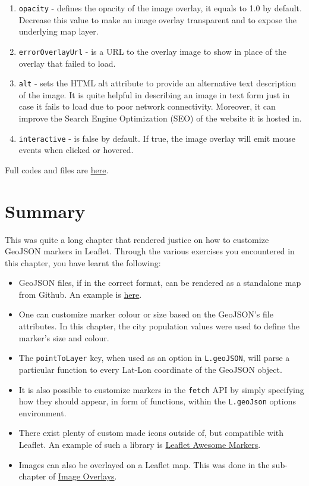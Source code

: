 \documentclass[
]{book}
\begin{document}
\begin{enumerate}
\def\labelenumi{\arabic{enumi}.}
\item
  \texttt{opacity} - defines the opacity of the image overlay, it equals to 1.0 by default. Decrease this value to make an image overlay transparent and to expose the underlying map layer.
\item
  \texttt{errorOverlayUrl} - is a URL to the overlay image to show in place of the overlay that failed to load.
\item
  \texttt{alt} - sets the HTML alt attribute to provide an alternative text description of the image. It is quite helpful in describing an image in text form just in case it fails to load due to poor network connectivity. Moreover, it can improve the Search Engine Optimization (SEO) of the website it is hosted in.
\item
  \texttt{interactive} - is false by default. If true, the image overlay will emit mouse events when clicked or hovered.
\end{enumerate}

Full codes and files are \href{https://github.com/sammigachuhi/my-leaflet-project/tree/main/my-leaflet-code/chapter-6-custom-markers}{here}.

\hypertarget{summary-5}{%
\section{Summary}\label{summary-5}}

This was quite a long chapter that rendered justice on how to customize GeoJSON markers in Leaflet. Through the various exercises you encountered in this chapter, you have learnt the following:

\begin{itemize}
\item
  GeoJSON files, if in the correct format, can be rendered as a standalone map from Github. An example is \href{https://github.com/sammigachuhi/geojson_files/blob/main/cities-geojson.geojson}{here}.
\item
  One can customize marker colour or size based on the GeoJSON's file attributes. In this chapter, the city population values were used to define the marker's size and colour.
\item
  The \texttt{pointToLayer} key, when used as an option in \texttt{L.geoJSON}, will parse a particular function to every Lat-Lon coordinate of the GeoJSON object.
\item
  It is also possible to customize markers in the \texttt{fetch} API by simply specifying how they should appear, in form of functions, within the \texttt{L.geoJson} options environment.
\item
  There exist plenty of custom made icons outside of, but compatible with Leaflet. An example of such a library is \href{https://github.com/lennardv2/Leaflet.awesome-markers}{Leaflet Awesome Markers}.
\item
  Images can also be overlayed on a Leaflet map. This was done in the sub-chapter of \protect\hyperlink{image-overlays}{Image Overlays}.
\end{itemize}
\end{document}
